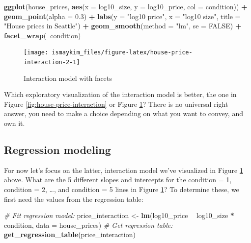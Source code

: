 \documentclass[12pt,]{krantz}
\makeatletter
\newenvironment{Shaded}{\begin{snugshade}}{\end{snugshade}}
\newcommand{\KeywordTok}[1]{\textcolor[rgb]{0.27,0.27,0.27}{\textbf{#1}}}
\newcommand{\DataTypeTok}[1]{\textcolor[rgb]{0.27,0.27,0.27}{#1}}
\newcommand{\FloatTok}[1]{\textcolor[rgb]{0.06,0.06,0.06}{#1}}
\newcommand{\StringTok}[1]{\textcolor[rgb]{0.5,0.5,0.5}{#1}}
\newcommand{\CommentTok}[1]{\textcolor[rgb]{0.37,0.37,0.37}{\textit{#1}}}
\newcommand{\OtherTok}[1]{\textcolor[rgb]{0.37,0.37,0.37}{#1}}
\newcommand{\OperatorTok}[1]{\textcolor[rgb]{0.43,0.43,0.43}{\textbf{#1}}}
\newcommand{\NormalTok}[1]{#1}
\newenvironment{kframe}{%
\medskip{}
\setlength{\fboxsep}{.8em}
 \def\at@end@of@kframe{}%
 \ifinner\ifhmode%
  \def\at@end@of@kframe{\end{minipage}}%
  \begin{minipage}{\columnwidth}%
 \fi\fi%
 \def\FrameCommand##1{\hskip\@totalleftmargin \hskip-\fboxsep
 \colorbox{shadecolor}{##1}\hskip-\fboxsep
     \hskip-\linewidth \hskip-\@totalleftmargin \hskip\columnwidth}%
 \MakeFramed {\advance\hsize-\width
   \@totalleftmargin\z@ \linewidth\hsize
   \@setminipage}}%
 {\par\unskip\endMakeFramed%
 \at@end@of@kframe}
\renewenvironment{Shaded}{\begin{kframe}}{\end{kframe}}
\theoremstyle{definition}
\theoremstyle{definition}
\theoremstyle{definition}
\theoremstyle{remark}
\makeatother
\begin{document}
\begin{Shaded}
\begin{Highlighting}[]
\KeywordTok{ggplot}\NormalTok{(house_prices, }\KeywordTok{aes}\NormalTok{(}\DataTypeTok{x =}\NormalTok{ log10_size, }\DataTypeTok{y =}\NormalTok{ log10_price, }\DataTypeTok{col =}\NormalTok{ condition)) }\OperatorTok{+}
\StringTok{  }\KeywordTok{geom_point}\NormalTok{(}\DataTypeTok{alpha =} \FloatTok{0.3}\NormalTok{) }\OperatorTok{+}
\StringTok{  }\KeywordTok{labs}\NormalTok{(}\DataTypeTok{y =} \StringTok{"log10 price"}\NormalTok{, }\DataTypeTok{x =} \StringTok{"log10 size"}\NormalTok{, }\DataTypeTok{title =} \StringTok{"House prices in Seattle"}\NormalTok{) }\OperatorTok{+}
\StringTok{  }\KeywordTok{geom_smooth}\NormalTok{(}\DataTypeTok{method =} \StringTok{"lm"}\NormalTok{, }\DataTypeTok{se =} \OtherTok{FALSE}\NormalTok{) }\OperatorTok{+}
\StringTok{  }\KeywordTok{facet_wrap}\NormalTok{(}\OperatorTok{~}\NormalTok{condition)}
\end{Highlighting}
\end{Shaded}

\begin{figure}

{\centering \texttt{[image: ismaykim\_files/figure-latex/house-price-interaction-2-1]} 

}

\caption{Interaction model with facets}\label{fig:house-price-interaction-2}
\end{figure}

Which exploratory visualization of the interaction model is better, the
one in Figure \ref{fig:house-price-interaction} or Figure
\ref{fig:house-price-interaction-2}? There is no universal right answer,
you need to make a choice depending on what you want to convey, and own
it.

\subsection{Regression modeling}\label{house-prices-regression}

For now let's focus on the latter, interaction model we've visualized in
Figure \ref{fig:house-price-interaction-2} above. What are the 5
different slopes and intercepts for the condition = 1, condition = 2,
\ldots{}, and condition = 5 lines in Figure
\ref{fig:house-price-interaction-2}? To determine these, we first need
the values from the regression table:

\begin{Shaded}
\begin{Highlighting}[]
\CommentTok{# Fit regression model:}
\NormalTok{price_interaction <-}\StringTok{ }\KeywordTok{lm}\NormalTok{(log10_price }\OperatorTok{~}\StringTok{ }\NormalTok{log10_size }\OperatorTok{*}\StringTok{ }\NormalTok{condition, }\DataTypeTok{data =}\NormalTok{ house_prices)}
\CommentTok{# Get regression table:}
\KeywordTok{get_regression_table}\NormalTok{(price_interaction)}
\end{Highlighting}
\end{Shaded}
\end{document}
